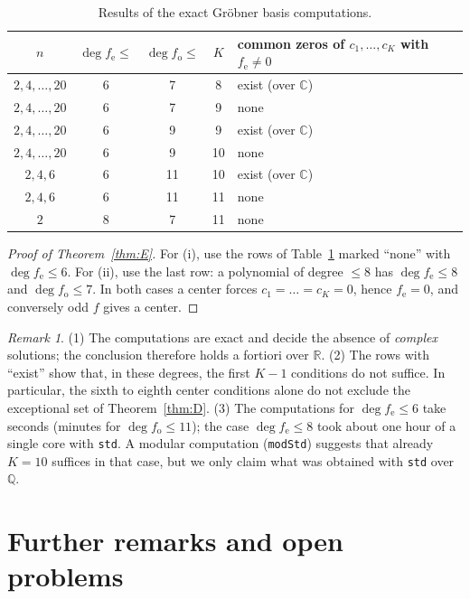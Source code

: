 \documentclass[11pt]{amsart}
\numberwithin{equation}{section}
\theoremstyle{plain}
\theoremstyle{definition}
\theoremstyle{remark}
\newtheorem{remark}[theorem]{Remark}
\newcommand{\R}{\mathbb{R}}
\newcommand{\Q}{\mathbb{Q}}
\newcommand{\C}{\mathbb{C}}
\newcommand{\fe}{f_{\mathrm e}}
\newcommand{\fo}{f_{\mathrm o}}
\begin{document}
\begin{table}[ht]
\centering
\begin{tabular}{@{}ccccl@{}}
\toprule
$n$ & $\deg\fe\le$ & $\deg\fo\le$ & $K$ & common zeros of $c_1,\dots,c_K$ with $\fe\ne0$\\
\midrule
$2,4,\dots,20$ & 6 & 7 & 8 & exist (over $\C$)\\
$2,4,\dots,20$ & 6 & 7 & 9 & none\\
$2,4,\dots,20$ & 6 & 9 & 9 & exist (over $\C$)\\
$2,4,\dots,20$ & 6 & 9 & 10 & none\\
$2,4,6$ & 6 & 11 & 10 & exist (over $\C$)\\
$2,4,6$ & 6 & 11 & 11 & none\\
$2$ & 8 & 7 & 11 & none\\
\bottomrule
\end{tabular}
\caption{Results of the exact Gr\"obner basis computations.}
\label{tab:comp}
\end{table}

\begin{proof}[Proof of Theorem~\ref{thm:E}]
For (i), use the rows of Table~\ref{tab:comp} marked ``none'' with
$\deg\fe\le6$. For (ii), use the last row: a polynomial of degree $\le8$ has
$\deg\fe\le8$ and $\deg\fo\le7$. In both cases a center forces
$c_1=\dots=c_K=0$, hence $\fe=0$, and conversely odd $f$ gives a center.
\end{proof}

\begin{remark}
(1) The computations are exact and decide the absence of \emph{complex}
solutions; the conclusion therefore holds a fortiori over $\R$.
(2) The rows with ``exist'' show that, in these degrees, the first $K-1$
conditions do not suffice. In particular, the sixth to eighth center conditions
alone do not exclude the exceptional set of Theorem~\ref{thm:D}.
(3) The computations for $\deg\fe\le6$ take seconds (minutes for
$\deg\fo\le11$); the case $\deg\fe\le8$ took about one hour of a single core
with \texttt{std}. A modular computation (\texttt{modStd}) suggests that
already $K=10$ suffices in that case, but we only claim what was obtained with
\texttt{std} over $\Q$.
\end{remark}

\section{Further remarks and open problems}\label{sec:final}
\end{document}
